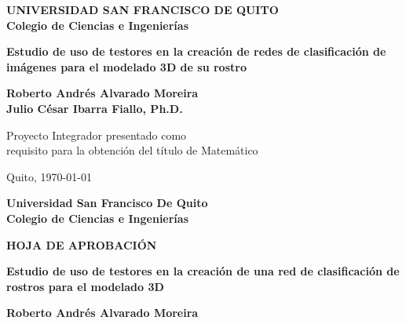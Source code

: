 \documentclass[a4paper, 12pt]{report}
\begin{document}
\pagestyle{empty}
\begin{center}
\LARGE\textbf{UNIVERSIDAD SAN FRANCISCO DE QUITO}\\
\setlength{\parskip}{5mm}
\LARGE\textbf{Colegio de Ciencias e Ingenierías}


\setlength{\parskip}{40mm}
\begin{LARGE}
  \textbf{Estudio de uso de testores en la creación de redes de clasificación de imágenes para el modelado 3D de su rostro}
\end{LARGE}


\setlength{\parskip}{20mm}
\begin{huge}
\textbf{Roberto Andrés Alvarado Moreira}\\
\textbf{Julio César Ibarra Fiallo, Ph.D.}
\end{huge}



\setlength{\parskip}{20mm}
\begin{large}
Proyecto Integrador presentado como\\
requisito para la obtención del título de Matemático
\end{large}

\vfill
Quito, \today


\setcounter{page}{1}

\thispagestyle{empty}
\end{center}

\newpage

\thispagestyle{empty}
\begin{center}

\Large\textbf{Universidad San Francisco De Quito}\\
\Large\textbf{Colegio de Ciencias e Ingenierías}
\vspace{0.5cm}

\huge\textbf{HOJA DE APROBACIÓN}
\vspace{1.5cm}

\large\textbf{Estudio de uso de testores en la creación de una red de clasificación de rostros para el modelado 3D}

\vspace{1cm}
\begin{LARGE}
\textbf{Roberto Andrés Alvarado Moreira}
\end{LARGE}
\end{center}

\vspace{2cm}
\end{document}
